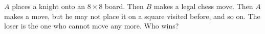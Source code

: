 $A$ places a knight onto an $8 \times 8$ board. Then $B$ makes a legal chess move. Then $A$ makes a move, but he may not place it on a square visited before, and so on. The loser is the one who cannot move any more. Who wins?
